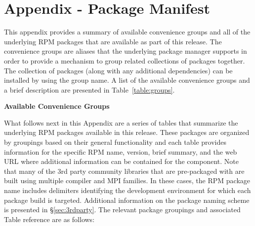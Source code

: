 \clearpage

\newcommand{\captionSpace}{-0.15cm}
\newcommand{\tabSpaceBot}{1.0cm}
\captionsetup{justification=raggedright,singlelinecheck=false}

\appendix
\section*{Appendix - Package Manifest}
\renewcommand{\thesubsection}{\Alph{subsection}}


This appendix provides a summary of available convenience groups and all of the
underlying RPM packages that are available as part of this \FSP{} release. The
convenience groups are aliases that the underlying package manager supports in
order to provide a mechanism to group related collections of packages
together. The collection of packages (along with any additional dependencies)
can be installed by using the group name. A list of the available convenience
groups and a brief description are presented in Table~\ref{table:groups}.

\vspace*{1.25cm}
\begin{table}[h] 
\caption{\bf Available \FSP{} Convenience Groups} \vspace*{\captionSpace{}}
\label{table:groups}

\end{table}

\newpage
What follows next in this Appendix are a series of tables that summarize the
underlying RPM packages available in this \FSP{} release. These packages are
organized by groupings based on their general functionality and each table
provides information for the specific RPM name, version, brief summary, and the
web URL where additional information can be contained for the component. Note
that many of the 3rd party community libraries that are pre-packaged
with \FSP{} are built using multiple compiler and MPI families. In these cases,
the RPM package name includes delimiters identifying the development
environment for which each package build is targeted.  Additional information
on the \FSP{} package naming scheme is presented in \S\ref{sec:3rdparty}. 
The relevant package groupings and associated Table reference are as follows:

\vspace*{0.1cm}

